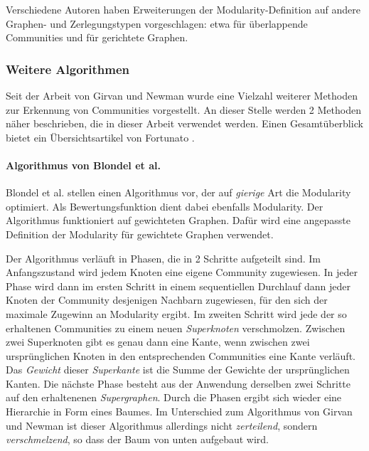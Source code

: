Verschiedene Autoren haben Erweiterungen der Modularity-Definition auf
andere Graphen- und Zerlegungstypen vorgeschlagen: etwa für
überlappende Communities\cite{Nicosia2009} und für gerichtete
Graphen\cite{Leicht2008}.

\subsubsection{Weitere Algorithmen}
\label{sec:algorithmen}

Seit der Arbeit von Girvan und Newman wurde eine Vielzahl weiterer
Methoden zur Erkennung von Communities vorgestellt. An dieser Stelle
werden 2 Methoden näher beschrieben, die in dieser Arbeit verwendet
werden. Einen Gesamtüberblick bietet ein Übersichtsartikel von
Fortunato \cite{Fortunato2010}.

\paragraph{Algorithmus von Blondel et al.}
\label{sec:algor-von-blond}

Blondel et al.\cite{Blondel2008} stellen einen Algorithmus vor, der
auf \emph{gierige} Art die Modularity optimiert.  Als
Bewertungsfunktion dient dabei ebenfalls Modularity. Der Algorithmus
funktioniert auf gewichteten Graphen. Dafür wird eine angepasste
Definition der Modularity für gewichtete Graphen
verwendet\cite{Newman2004a}.

Der Algorithmus verläuft in Phasen, die in 2 Schritte aufgeteilt
sind. Im Anfangszustand wird jedem Knoten eine eigene Community
zugewiesen. In jeder Phase wird dann im ersten Schritt in einem
sequentiellen Durchlauf dann jeder Knoten der Community desjenigen
Nachbarn zugewiesen, für den sich der maximale Zugewinn an
Modularity ergibt. Im zweiten Schritt wird jede der so erhaltenen
Communities zu einem neuen \emph{Superknoten} verschmolzen. Zwischen
zwei Superknoten gibt es genau dann eine Kante, wenn zwischen zwei
ursprünglichen Knoten in den entsprechenden Communities eine Kante
verläuft. Das \emph{Gewicht} dieser \emph{Superkante} ist die Summe
der Gewichte der ursprünglichen Kanten. Die nächste Phase besteht
aus der Anwendung derselben zwei Schritte auf den erhaltenenen
\emph{Supergraphen}. Durch die Phasen ergibt sich wieder eine
Hierarchie in Form eines Baumes. Im Unterschied zum Algorithmus von
Girvan und Newman ist dieser Algorithmus allerdings nicht
\emph{zerteilend}, sondern \emph{verschmelzend}, so dass der Baum von
unten aufgebaut wird.

